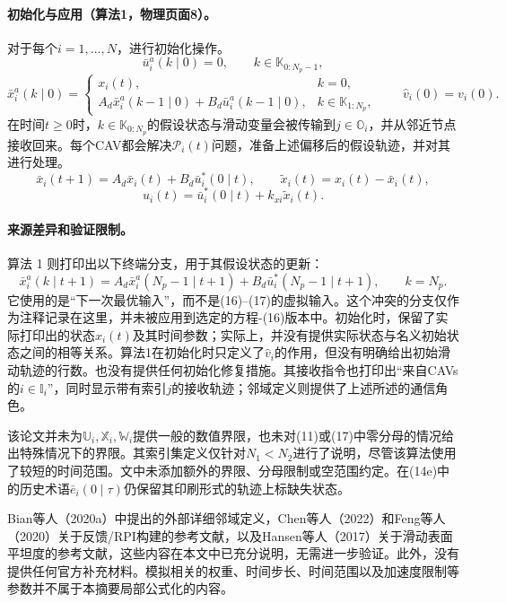 \documentclass{article}
\begin{document}
\paragraph{初始化与应用（算法1，物理页面8）。}
对于每个$i=1,\ldots,N$，进行初始化操作。
\[
\bar u_i^a(k\mid0)=0,\qquad k\in\mathbb K_{0:N_p-1},
\]
\[
\bar x_i^a(k\mid0)=
\begin{cases}
x_i(t),&k=0,\\
A_d\bar x_i^a(k-1\mid0)+B_d\bar u_i^a(k-1\mid0),
&k\in\mathbb K_{1:N_p},
\end{cases}
\qquad
\widehat v_i(0)=v_i(0).
\]
在时间$t\geq0$时，$k\in\mathbb K_{0:N_p}$的假设状态与滑动变量会被传输到$j\in\mathbb O_i$，并从邻近节点接收回来。每个CAV都会解决$\mathscr P_i(t)$问题，准备上述偏移后的假设轨迹，并对其进行处理。
\[
\bar x_i(t+1)=A_d\bar x_i(t)+B_d\bar u_i^*(0\mid t),
\qquad
\widetilde x_i(t)=x_i(t)-\bar x_i(t),
\]
\[
u_i(t)=\bar u_i^*(0\mid t)+k_{xi}\widetilde x_i(t).
\]

\paragraph{来源差异和验证限制。}
算法 1 则打印出以下终端分支，用于其假设状态的更新：
\[
\bar x_i^a(k\mid t+1)
=A_d\bar x_i^a(N_p-1\mid t+1)
 +B_d\bar u_i^*(N_p-1\mid t+1),\qquad k=N_p.
\]
它使用的是“下一次最优输入”，而不是(16)--(17)的虚拟输入。这个冲突的分支仅作为注释记录在这里，并未被应用到选定的方程-(16)版本中。初始化时，保留了实际打印出的状态$x_i(t)$及其时间参数；实际上，并没有提供实际状态与名义初始状态之间的相等关系。算法1在初始化时只定义了$\widehat v_i$的作用，但没有明确给出初始滑动轨迹的行数。也没有提供任何初始化修复措施。其接收指令也打印出“来自CAVs的$i\in\mathbb I_i$”，同时显示带有索引$j$的接收轨迹；邻域定义则提供了上述所述的通信角色。

该论文并未为$\mathbb U_i,\mathbb X_i,\mathbb W_i$提供一般的数值界限，也未对(11)或(17)中零分母的情况给出特殊情况下的界限。其索引集定义仅针对$N_1<N_2$进行了说明，尽管该算法使用了较短的时间范围。文中未添加额外的界限、分母限制或空范围约定。在(14e)中的历史术语$\bar e_i(0\mid\tau)$仍保留其印刷形式的轨迹上标缺失状态。

Bian等人（2020a）中提出的外部详细邻域定义，Chen等人（2022）和Feng等人（2020）关于反馈/RPI构建的参考文献，以及Hansen等人（2017）关于滑动表面平坦度的参考文献，这些内容在本文中已充分说明，无需进一步验证。此外，没有提供任何官方补充材料。模拟相关的权重、时间步长、时间范围以及加速度限制等参数并不属于本摘要局部公式化的内容。
\end{document}
